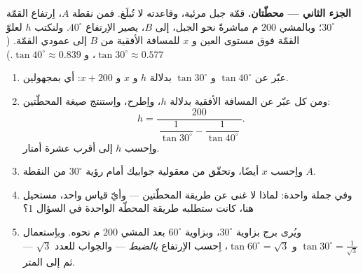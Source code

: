 \begin{problem}
\medskip
\noindent\textbf{الجزء الثاني --- محطّتان.}
قمّة جبل مرئية، وقاعدته لا تُبلَغ. فمن نقطة $A$، اِرتفاع القمّة
$30^\circ$؛ وبالمشي $200$ م مباشرةً نحو الجبل، إلى $B$، يصير
الاِرتفاع $40^\circ$. ولنكتب $h$ لعلوّ القمّة فوق مستوى العين
و $x$ للمسافة الأفقية من $B$ إلى عمودي القمّة.
($\tan 30^\circ \approx 0.577$،
و $\tan 40^\circ \approx 0.839$.)
\begin{enumerate}[resume]
  \item عبّر عن $\tan 40^\circ$ و $\tan 30^\circ$ بدلالة $h$
        و $x$ و $x + 200$: أي  بمجهولين.
  \item ومن كل  عبّر عن المسافة الأفقية بدلالة $h$،
        واِطرح، واِستنتج صيغة المحطّتين:
        \[
        h = \frac{200}
        {\ \dfrac{1}{\tan 30^\circ} - \dfrac{1}{\tan 40^\circ}\ } .
        \]
        واِحسب $h$ إلى أقرب عشرة أمتار.
  \item واِحسب $x$ أيضًا، وتحقّق من معقولية جوابيك أمام رؤية
        $30^\circ$ من النقطة $A$.
  \item وفي جملة واحدة: لماذا لا غنى عن طريقة المحطّتين ---
        وأيّ قياس واحد، مستحيل هنا، كانت ستطلبه طريقة المحطّة
        الواحدة في السؤال 1؟
  \item ويُرى برج بزاوية $30^\circ$، وبزاوية $60^\circ$ بعد
        المشي $200$ م نحوه. وباِستعمال
        $\tan 30^\circ = \frac{1}{\sqrt3}$
        و $\tan 60^\circ = \sqrt3$، اِحسب الاِرتفاع
        \emph{بالضبط} --- والجواب  للعدد
        $\sqrt3$ --- ثم إلى المتر.
\end{enumerate}


\end{problem}
